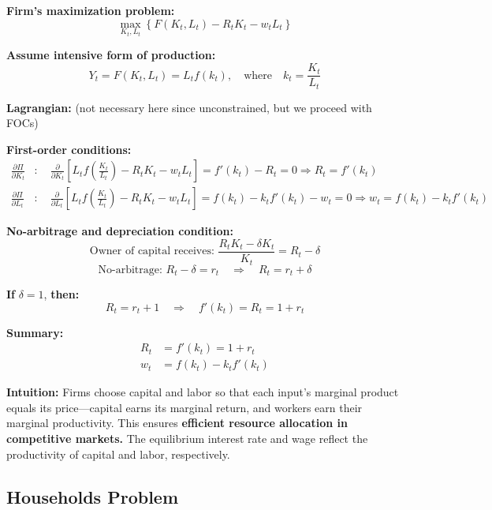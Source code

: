 \documentclass[12pt]{article}
\begin{document}
{\color{blue}
\textbf{Firm's maximization problem:}
\[
\max_{K_t, L_t} \left\{ F(K_t, L_t) - R_t K_t - w_t L_t \right\}
\]

\textbf{Assume intensive form of production:}
\[
Y_t = F(K_t, L_t) = L_t f(k_t), \quad \text{where} \quad k_t = \frac{K_t}{L_t}
\]

\textbf{Lagrangian:} (not necessary here since unconstrained, but we proceed with FOCs)

\textbf{First-order conditions:}
\begin{align*}
\frac{\partial \Pi}{\partial K_t} &: \quad \frac{\partial}{\partial K_t} \left[ L_t f\left( \frac{K_t}{L_t} \right) - R_t K_t - w_t L_t \right] 
= f'(k_t) - R_t = 0 \Rightarrow R_t = f'(k_t) \\
\frac{\partial \Pi}{\partial L_t} &: \quad \frac{\partial}{\partial L_t} \left[ L_t f\left( \frac{K_t}{L_t} \right) - R_t K_t - w_t L_t \right] 
= f(k_t) - k_t f'(k_t) - w_t = 0 \Rightarrow w_t = f(k_t) - k_t f'(k_t)
\end{align*}

\textbf{No-arbitrage and depreciation condition:}
\[
\text{Owner of capital receives: } \frac{R_t K_t - \delta K_t}{K_t} = R_t - \delta
\]
\[
\text{No-arbitrage: } R_t - \delta = r_t \quad \Rightarrow \quad R_t = r_t + \delta
\]

\textbf{If } $\delta = 1$, \textbf{then:}
\[
R_t = r_t + 1 \quad \Rightarrow \quad f'(k_t) = R_t = 1 + r_t
\]

\textbf{Summary:}
\begin{align*}
R_t &= f'(k_t) = 1 + r_t \\
w_t &= f(k_t) - k_t f'(k_t)
\end{align*}
}

\textbf{Intuition: }Firms choose capital and labor so that each input’s marginal product equals its price—capital earns its marginal return, and workers earn their marginal productivity.
This ensures \textbf{efficient resource allocation in competitive markets.}
The equilibrium interest rate and wage reflect the productivity of capital and labor, respectively.


\subsection*{\noindent\textbf{{Households Problem}}}
\end{document}
